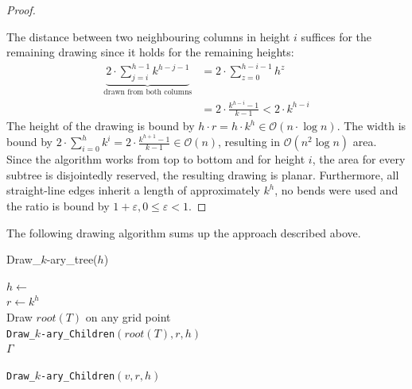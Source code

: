 \begin{proof}
\begin{figure}[H]
\end{figure}
	The distance between two neighbouring columns in height $i$ suffices for the remaining drawing since it holds for the remaining heights:
	\begin{align}
		\underbrace{2\cdot \sum_{j=i}^{h-1} k^{h-j-1}}_{\text{drawn from both columns}} &= 2\cdot\sum_{z = 0}^{h-i-1}h^z\\
		&= 2\cdot\frac{k^{h-i}-1}{k-1} < 2\cdot k^{h-i}
	\end{align}
	The height of the drawing is bound by $h\cdot r = h\cdot k^h \in \mathcal{O}(n\cdot \log n)$. 
	The width is bound by $2\cdot\sum_{i = 0}^{h} k^i = 2\cdot \frac{k^{h+1}-1}{k-1} \in \mathcal{O}(n)$, resulting in $\mathcal{O}(n^2\log n)$ area.\\ 
	Since the algorithm works from top to bottom and for height $i$, the area for every subtree is disjointedly reserved, the resulting drawing is planar. Furthermore, all straight-line edges inherit a length of approximately $k^h$, no bends were used and the ratio is bound by $1+\varepsilon, 0\leq \varepsilon<1$.
\end{proof}
\bigskip
The following drawing algorithm sums up the approach described above.\\
\begin{algorithm}[H]
	\caption{Draw\_$k$-ary\_tree($h$)}\label{al:complete_k-ary_tree}
	$h \gets $ \\
	$r \gets k^h$\\
	Draw $root(T)$ on any grid point\\
	\texttt{Draw\_$k$-ary\_Children}$(root(T),r,h)$\\
	\Return $\Gamma$
\end{algorithm}
\begin{algorithm}[H]
	\caption{\texttt{Draw\_$k$-ary\_Children}$(v,r,h)$}
\end{algorithm}

